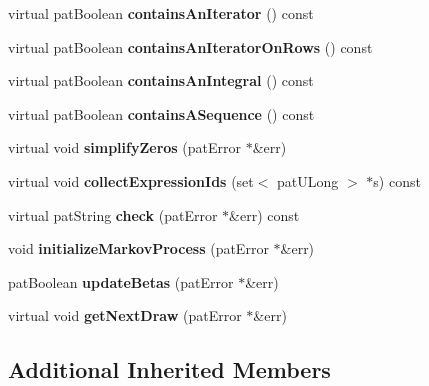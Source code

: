 \begin{DoxyCompactItemize}
virtual pat\+Boolean {\bfseries contains\+An\+Iterator} () const
\item 
\mbox{\label{classbio_arith_bayes_m_h_aa650cb3d15ba6689d122f54658a53911}} 
virtual pat\+Boolean {\bfseries contains\+An\+Iterator\+On\+Rows} () const
\item 
\mbox{\label{classbio_arith_bayes_m_h_a3834d4837029d2b66c4aa74848e53890}} 
virtual pat\+Boolean {\bfseries contains\+An\+Integral} () const
\item 
\mbox{\label{classbio_arith_bayes_m_h_a9d31f2a947d430b9903bcd0ce4943417}} 
virtual pat\+Boolean {\bfseries contains\+A\+Sequence} () const
\item 
\mbox{\label{classbio_arith_bayes_m_h_a1948c116d57eecf5508a9d17c670987d}} 
virtual void {\bfseries simplify\+Zeros} (pat\+Error $\ast$\&err)
\item 
\mbox{\label{classbio_arith_bayes_m_h_adada57d93c6a215b52b504f621556d3e}} 
virtual void {\bfseries collect\+Expression\+Ids} (set$<$ pat\+U\+Long $>$ $\ast$s) const
\item 
\mbox{\label{classbio_arith_bayes_m_h_a0fcc9286993eab61ac751f41dc518efb}} 
virtual pat\+String {\bfseries check} (pat\+Error $\ast$\&err) const
\item 
\mbox{\label{classbio_arith_bayes_m_h_a7fab1f00661fb7bacf0e618a1dc36984}} 
void {\bfseries initialize\+Markov\+Process} (pat\+Error $\ast$\&err)
\item 
\mbox{\label{classbio_arith_bayes_m_h_a84261bf632f0fa9505d25bf877b62199}} 
pat\+Boolean {\bfseries update\+Betas} (pat\+Error $\ast$\&err)
\item 
\mbox{\label{classbio_arith_bayes_m_h_a7e9507046b42b230eab714f4003461f0}} 
virtual void {\bfseries get\+Next\+Draw} (pat\+Error $\ast$\&err)
\end{DoxyCompactItemize}
\subsection*{Additional Inherited Members}


